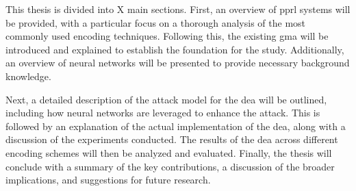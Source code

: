 This thesis is divided into X main sections.
First, an overview of \ac{pprl} systems will be provided, with a particular focus on a thorough analysis of the most commonly used encoding techniques.
Following this, the existing \ac{gma} will be introduced and explained to establish the foundation for the study.
Additionally, an overview of neural networks will be presented to provide necessary background knowledge.

Next, a detailed description of the attack model for the \ac{dea} will be outlined, including how neural networks are leveraged to enhance the attack.
This is followed by an explanation of the actual implementation of the \ac{dea}, along with a discussion of the experiments conducted.
The results of the \ac{dea} across different encoding schemes will then be analyzed and evaluated.
Finally, the thesis will conclude with a summary of the key contributions, a discussion of the broader implications, and suggestions for future research.
